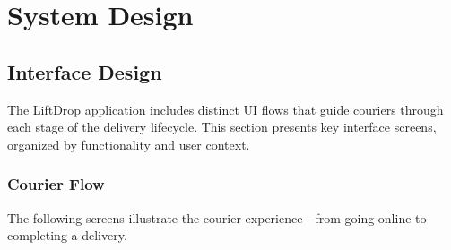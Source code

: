 \section{System Design}



\vspace{2mm}

\subsection{Interface Design}

The LiftDrop application includes distinct UI flows that guide couriers through each stage of the delivery lifecycle. This section presents key interface screens, organized by functionality and user context.


\subsubsection{Courier Flow}

The following screens illustrate the courier experience—from going online to completing a delivery.

